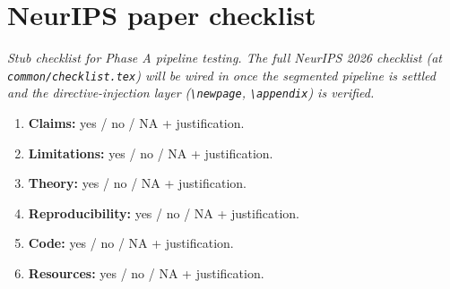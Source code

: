 \section*{NeurIPS paper checklist}

\textit{Stub checklist for Phase A pipeline testing. The full NeurIPS 2026 checklist (at \texttt{common/checklist.tex}) will be wired in once the segmented pipeline is settled and the directive-injection layer (\texttt{\textbackslash newpage}, \texttt{\textbackslash appendix}) is verified.}

\begin{enumerate}
\item \textbf{Claims:} yes / no / NA + justification.
\item \textbf{Limitations:} yes / no / NA + justification.
\item \textbf{Theory:} yes / no / NA + justification.
\item \textbf{Reproducibility:} yes / no / NA + justification.
\item \textbf{Code:} yes / no / NA + justification.
\item \textbf{Resources:} yes / no / NA + justification.
\end{enumerate}
